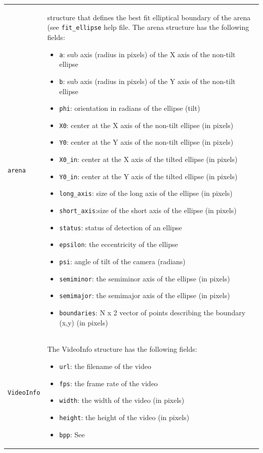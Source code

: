 \documentclass[letterpaper, 11pt]{article}
\begin{document}
\begin{center}
\begin{longtable}{ p{5cm}  p{8cm} }
    \texttt{arena} & structure that defines the best fit elliptical boundary of the arena (see \texttt{fit\_ellipse} help file.  The arena structure has the
    following fields: \begin{itemize} \item \texttt{a}: sub axis (radius in pixels) of the X axis of the non-tilt ellipse
    \item \texttt{b}:   sub axis (radius in pixels) of the Y axis of the non-tilt ellipse
    \item \texttt{phi}: orientation in radians of the ellipse (tilt)
    \item \texttt{X0}: center at the X axis of the non-tilt ellipse (in pixels)
    \item \texttt{Y0}: center at the Y axis of the non-tilt ellipse (in pixels)
    \item \texttt{X0\_in}: center at the X axis of the tilted ellipse (in pixels)
    \item \texttt{Y0\_in}: center at the Y axis of the tilted ellipse (in pixels)
    \item \texttt{long\_axis}: size of the long axis of the ellipse (in pixels)
    \item \texttt{short\_axis}:size of the short axis of the ellipse (in pixels)
    \item \texttt{status}: status of detection of an ellipse
    \item \texttt{epsilon}: the eccentricity of the ellipse
    \item \texttt{psi}: angle of tilt of the camera (radians)
    \item \texttt{semiminor}: the semiminor axis of the ellipse (in pixels)
    \item \texttt{semimajor}: the semimajor axis of the ellipse (in pixels)
    \item \texttt{boundaries}: N x 2 vector of points describing the boundary (x,y) (in pixels)
    \end{itemize}\\
    \texttt{VideoInfo} & The VideoInfo structure
    has the following fields: \begin{itemize} \item \texttt{url}: the filename of the video \item
    \texttt{fps}: the frame rate of the video \item \texttt{width}: the width of the video (in
    pixels) \item \texttt{height}: the height of the video (in pixels) \item \texttt{bpp}:  See

\end{itemize}
\end{longtable}
\end{center}
\end{document}
